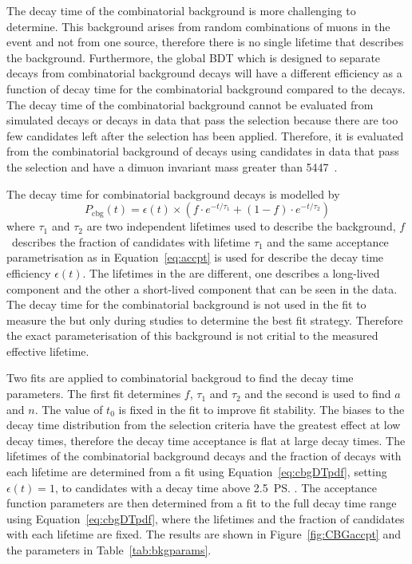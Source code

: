 The decay time \pdf of the combinatorial background is more challenging to determine. This background arises from random combinations of muons in the event and not from one source, therefore there is no single lifetime that describes the background. Furthermore, the global BDT which is designed to separate \bsmumu decays from combinatorial background decays will have a different efficiency as a function of decay time for the combinatorial background compared to the \bsmumu decays. The decay time \pdf of the combinatorial background cannot be evaluated from simulated decays or decays in data that pass the \bsmumu selection because there are too few candidates left after the selection has been applied. %
Therefore, it is evaluated from the combinatorial background of \bhh decays using candidates in data that pass the \bhh selection and have a dimuon invariant mass greater than 5447~\mevcc. %

The decay time \pdf for combinatorial background decays is modelled by
\begin{equation}
P_{\mathrm{cbg}}(t) = \epsilon(t)\times \left( f \cdot e^{-t/\tau_{1}} + (1-f)\cdot e^{-t/\tau_{2}} \right)
\label{eq:cbgDTpdf}
\end{equation}
where $\tau_{1}$ and $\tau_{2}$ are two independent lifetimes used to describe the background, $f$~describes the fraction of candidates with lifetime $\tau_{1}$ and the same acceptance parametrisation as in Equation~\ref{eq:accpt} is used for describe the decay time efficiency $\epsilon(t)$. The lifetimes in the \pdf are different, one describes a long-lived component and the other a short-lived component that can be seen in the data. The decay time \pdf for the combinatorial background is not used in the fit to measure the \el but only during studies to determine the best fit strategy. Therefore the exact parameterisation of this background is not critial to the measured \bsmumu effective lifetime.  

Two fits are applied to \bhh combinatorial backgroud to find the decay time \pdf parameters. The first fit determines $f$, $\tau_1$ and $\tau_2$ and the second is used to find $a$ and $n$. The value of $t_0$ is fixed in the fit to improve fit stability.
The biases to the decay time distribution from the selection criteria have the greatest effect at low decay times, therefore the decay time acceptance is flat at large decay times. The lifetimes of the combinatorial background decays and the fraction of decays with each lifetime are determined from a fit using Equation~\ref{eq:cbgDTpdf}, setting $\epsilon(t)=1$, to candidates with a decay time above 2.5~\ps. The acceptance function parameters are then determined from a fit to the full decay time range using Equation~\ref{eq:cbgDTpdf}, where the lifetimes and the fraction of candidates with each lifetime are fixed. The results are shown in Figure~\ref{fig:CBGaccpt} and the \pdf parameters in Table~\ref{tab:bkgparams}. %

